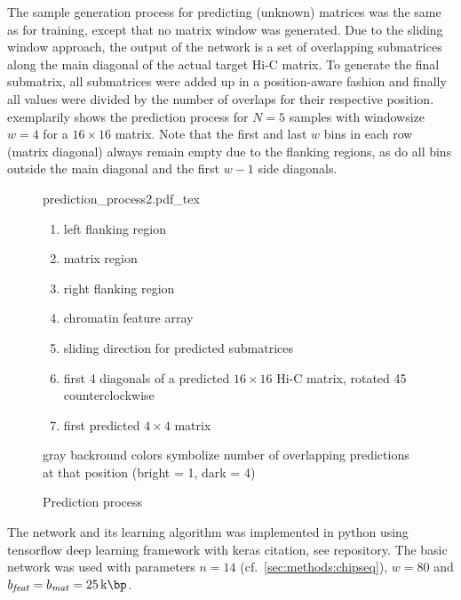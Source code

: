 The sample generation process for predicting (unknown) matrices was the same as for training,
except that no matrix window was generated.
Due to the sliding window approach, the output of the network is a set of overlapping submatrices along the main diagonal of the actual target Hi-C matrix.
To generate the final submatrix, all submatrices were added up in a position-aware fashion 
and finally all values were divided by the number of overlaps for their respective position.
 exemplarily shows the prediction process for $N=5$ samples with windowsize $w=4$ for a $16\times16$ matrix.
Note that the first and last $w$ bins in each row (matrix diagonal) always remain empty due to the flanking regions,
as do all bins outside the main diagonal and the first $w-1$ side diagonals.
\begin{figure}
 \begin{minipage}{0.60\textwidth}
   \centering
    \small
    {prediction_process2.pdf_tex}
    \caption{Prediction process}
    \label{fig:methods:prediction}
 \end{minipage}\hfill
 \begin{minipage}{0.3\textwidth}
 \scriptsize
  \begin{enumerate}[label=\Alph*:,leftmargin=*]
   \raggedright
    \item left flanking region
    \item matrix region
    \item right flanking region
    \item chromatin feature array
    \item sliding direction for predicted submatrices
    \item first 4 diagonals of a predicted $16\times16$ Hi-C matrix, rotated \SI{45}{\deg} counterclockwise
    \item first predicted $4\times4$ matrix
\end{enumerate}
\raggedright{gray backround colors symbolize number of overlapping predictions at that position (bright = 1, dark = 4)}
 \end{minipage}
\end{figure}

The network and its learning algorithm was implemented in python using tensorflow deep learning framework with keras \xxx citation, see \xxx repository.
The basic network was used with parameters $n=14$ (cf.~\cref{sec:methods:chipseq}), $w=80$ and $b_\mathit{feat}=b_\mathit{mat} = \SI{25}{\kilo\bp}$. 

